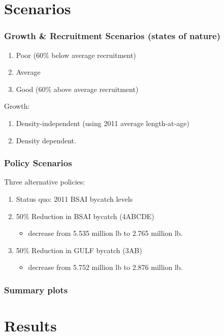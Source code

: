\documentclass{beamer}
\begin{document}
\section{Scenarios} %
\label{sec:scenarios}
\begin{frame}[m]\frametitle{Growth \& Recruitment Scenarios (states of nature)}
	\begin{enumerate}
		\item<1> Poor (60\% below average recruitment)
		\item<1> Average
		\item<1> Good (60\% above average recruitment)
	\end{enumerate}
	Growth: 
	\begin{enumerate}
		\item<2> Density-independent (using 2011 average length-at-age)
		\item<2> Density dependent. 
	\end{enumerate}
\end{frame}
%
\begin{frame}[m]\frametitle{Policy Scenarios}
	Three alternative policies:
	\begin{enumerate}
		\item Status quo: 2011 BSAI bycatch levels
		\item 50\% Reduction in BSAI bycatch (4ABCDE)
		 \begin{itemize}
		 	\item decrease from 5.535 million lb to 2.765 million lb.
		 \end{itemize}
		\item 50\% Reduction in GULF bycatch (3AB)
		\begin{itemize}
			\item decrease from 5.752 million lb to 2.876 million lb.
		\end{itemize}
	\end{enumerate}
\end{frame}
%
\begin{frame}[t]\frametitle{Summary plots}
	\centering
\end{frame}
%
\section{Results} %
\label{sec:results}
\end{document}
